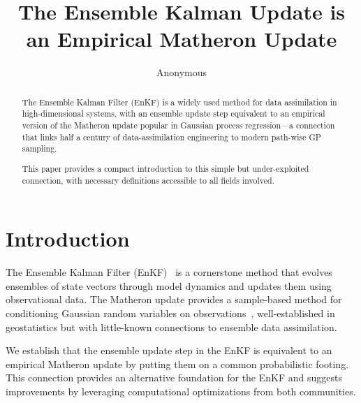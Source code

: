 \documentclass[runningheads]{llncs}
\title{The Ensemble Kalman Update is an Empirical Matheron Update}
\author{Anonymous}
\institute{Anonymous Institution}
\begin{document}



\maketitle

\begin{abstract}
The Ensemble Kalman Filter (EnKF) is a widely used method for data assimilation in high-dimensional systems, with an ensemble update step equivalent to an empirical version of the Matheron update popular in Gaussian process regression—a connection that links half a century of data-assimilation engineering to modern path-wise GP sampling.

This paper provides a compact introduction to this simple but under-exploited connection, with necessary definitions accessible to all fields involved.

\end{abstract}

\section{Introduction}

The Ensemble Kalman Filter (EnKF)~\cite{Evensen2003Ensemble,Evensen2009Data} is a cornerstone method that evolves ensembles of state vectors through model dynamics and updates them using observational data. The Matheron update provides a sample-based method for conditioning Gaussian random variables on observations~\cite{Doucet2010Note,Wilson2020Efficiently,Wilson2021Pathwise}, well-established in geostatistics but with little-known connections to ensemble data assimilation.

We establish that the ensemble update step in the EnKF is equivalent to an empirical Matheron update by putting them on a common probabilistic footing. This connection provides an alternative foundation for the EnKF and suggests improvements by leveraging computational optimizations from both communities.
\end{document}
